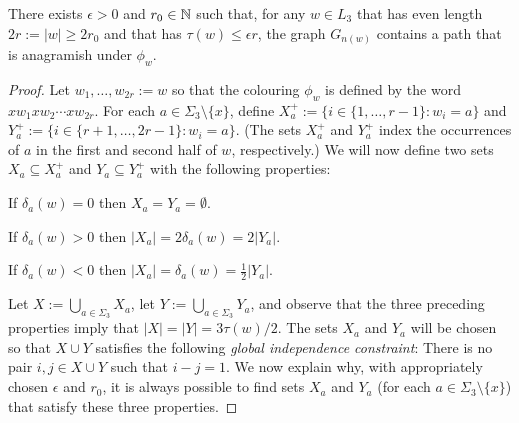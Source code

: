 \documentclass{patmorin}
\begin{document}
\begin{lem}\label{anagramish_path}
    There exists $\epsilon>0$ and $r_0\in\mathbb{N}$ such that, for any $w\in L_3$ that has even length $2r:=|w|\ge 2r_0$ and that has $\tau(w)\le\epsilon r$, the graph $G_{n(w)}$ contains a path that is anagramish under $\phi_w$.
\end{lem}

\begin{proof}
    Let $w_1,\ldots,w_{2r}:=w$ so that the colouring $\phi_w$ is defined by the word $xw_1xw_2\cdots xw_{2r}$.
    For each $a\in\Sigma_3\setminus\{x\}$, define $X^+_a:=\{i\in\{1,\ldots,r-1\}:w_i=a\}$ and $Y^+_a:=\{i\in\{r+1,\ldots,2r-1\}:w_i=a\}$.  (The sets $X^+_a$ and $Y^+_a$ index the occurrences of $a$ in the first and second half of $w$, respectively.)   We will now define two sets $X_a\subseteq X^+_a$ and $Y_a\subseteq Y^+_a$ with the following properties:
    \begin{compactenum}
        \item If $\delta_a(w)=0$ then $X_a=Y_a=\emptyset$.
        \item If $\delta_a(w)>0$ then $|X_a|=2\delta_a(w)=2|Y_a|$.
        \item If $\delta_a(w)<0$ then $|X_a|=\delta_a(w)=\tfrac{1}{2}|Y_a|$.
    \end{compactenum}
    Let $X:=\bigcup_{a\in\Sigma_3} X_a$, let $Y:=\bigcup_{a\in\Sigma_3} Y_a$, and observe that the three preceding properties imply that $|X|=|Y|=3\tau(w)/2$.  The sets $X_a$ and $Y_a$ will be chosen so that $X\cup Y$ satisfies the following \emph{global independence constraint}:  There is no pair $i,j\in X\cup Y$ such that $i-j=1$.  We now explain why, with appropriately chosen $\epsilon$ and $r_0$, it is always possible to find sets $X_a$ and $Y_a$ (for each $a\in\Sigma_3\setminus\{x\}$) that satisfy these three properties.
    
    

\end{proof}
\end{document}
